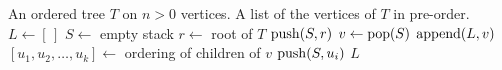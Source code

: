 
\begin{algorithmic}[1]
\Require An ordered tree $T$ on $n > 0$ vertices.
\Ensure A list of the vertices of $T$ in pre-order.
\State $L \gets [\,]$
\State $S \gets$ empty stack
\State $r \gets$ root of $T$
\State $\operatorname*{push}(S, r)$
  \State $v \gets \operatorname*{pop}(S)$
  \State $\operatorname*{append}(L, v)$
  \State $[u_1, u_2, \dots, u_k] \gets$ ordering of children of $v$
    \State $\operatorname*{push}(S, u_i)$
  \EndFor
\EndWhile
\State \Return $L$
\end{algorithmic}
